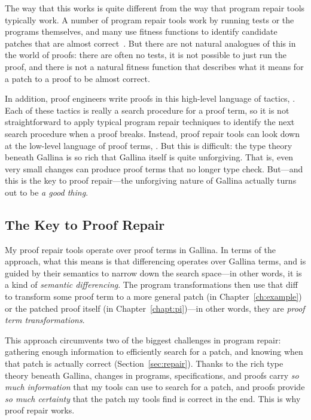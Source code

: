 The way that this works is quite different from the way that program repair tools typically work.
A number of program repair tools work by running tests or the programs themselves,
and many use fitness functions to identify candidate patches that 
are almost correct~\cite{Monperrus:2018:ASR:3177787.3105906}. %
But there are not natural analogues of this in the world of proofs:
there are often no tests, it is not possible to just run the proof, and there is not a natural 
fitness function that describes what it means for a patch to a proof to be almost correct.

In addition, proof engineers write proofs in this high-level language of tactics, .
Each of these tactics is really a search procedure for a proof term, so it is not straightforward to apply
typical program repair techniques to identify the next search procedure when a proof breaks.
Instead, proof repair tools can look down at the low-level language of proof terms, .
But this is difficult: the type theory beneath Gallina is so rich that Gallina itself is quite unforgiving.
That is, even very small changes can produce proof terms that no longer type check.
But---and this is the key to proof repair---the unforgiving nature of Gallina actually turns out to be \textit{a good thing}.

\subsection{The Key to Proof Repair}
\label{sec:infocert}

My proof repair tools operate over proof terms in Gallina.
In terms of the approach, what this means is that differencing operates over Gallina terms,
and is guided by their semantics to narrow down the search space---in other words,
it is a kind of \textit{semantic differencing}.
The program transformations then use that diff to transform some proof term to a more general patch (in Chapter~\ref{ch:example})
or the patched proof itself (in Chapter~\ref{chapt:pi})---in other words,
they are \textit{proof term transformations}.

This approach circumvents two of the biggest challenges in program repair:
gathering enough information to efficiently search for a patch,
and knowing when that patch is actually correct (Section~\ref{sec:repair}).
Thanks to the rich type theory beneath Gallina, changes in programs, specifications, and proofs
carry \textit{so much information} that my tools can use to search for a patch,
and proofs provide \textit{so much certainty} that the patch my tools find is correct in the end.
This is why proof repair works.

